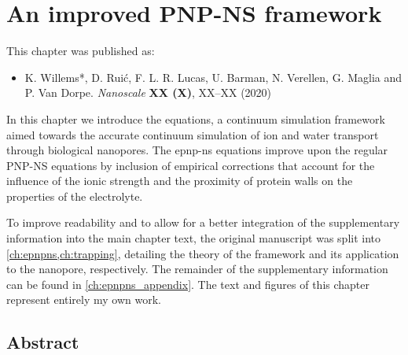 \chapter{An improved PNP-NS framework}
%
\label{ch:epnpns}
%


%
%
\begin{shaded}
This chapter was published as:
%
\begin{itemize}
  \item K. Willems*, D. Rui\'{c}, F. L. R. Lucas, U. Barman, N. Verellen, G. Maglia and P. Van Dorpe.
        \textit{Nanoscale} \textbf{XX (X)}, XX--XX (2020) %
\end{itemize}
%
\newpage
\end{shaded}
%
%


In this chapter we introduce the  equations, a continuum simulation framework aimed towards
the accurate continuum simulation of ion and water transport through biological nanopores. The \gls{epnp-ns}
equations improve upon the regular {PNP-NS} equations by inclusion of empirical corrections that account for
the influence of the ionic strength and the proximity of protein walls on the properties of the electrolyte.
%

%
To improve readability and to allow for a better integration of the supplementary information into the main
chapter text, the original manuscript was split into \cref{ch:epnpns,ch:trapping}, detailing the theory of the
framework and its application to the  nanopore, respectively. The remainder of the
supplementary information can be found in \cref{ch:epnpns_appendix}. The text and figures of this chapter
represent entirely my own work.
%

%
%
%


\section{Abstract}
%
\label{sec:epnpns:abstract}
%


